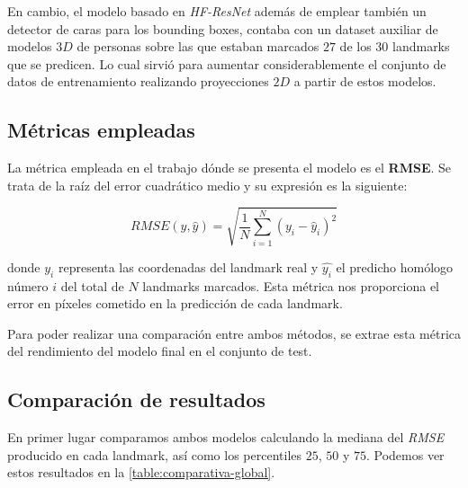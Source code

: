             \medskip

            \noindent En cambio, el modelo basado en \textit{HF-ResNet} además de emplear también un detector de caras para los bounding boxes, contaba con un dataset auxiliar de modelos $3D$ de personas sobre las que estaban marcados $27$ de los $30$ landmarks que se predicen. Lo cual sirvió para aumentar considerablemente el conjunto de datos de entrenamiento realizando proyecciones $2D$ a partir de estos modelos.

        \subsection{Métricas empleadas}
            \noindent La métrica empleada en el trabajo dónde se presenta el modelo es el \textbf{RMSE}. Se trata de la raíz del error cuadrático medio y su expresión es la siguiente: 

            \begin{equation}
                RMSE(y,\widehat{y})= \sqrt{\frac{1}{N} \sum_{i=1}^{N} (y_i-\widehat{y}_i)^2}
            \end{equation}

            \noindent donde $y_i$ representa las coordenadas del landmark real y $\widehat{y_i}$ el predicho homólogo número $i$ del total de $N$ landmarks marcados. Esta métrica nos proporciona el error en píxeles cometido en la predicción de cada landmark.

            \medskip

            \noindent Para poder realizar una comparación entre ambos métodos, se extrae esta métrica del rendimiento del modelo final en el conjunto de test. 

        \subsection{Comparación de resultados}
            \noindent En primer lugar comparamos ambos modelos calculando la mediana del \textit{RMSE} producido en cada landmark, así como los percentiles $25$, $50$ y $75$. Podemos ver estos resultados en la \autoref{table:comparativa-global}.

